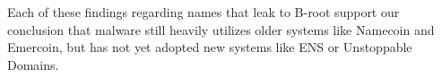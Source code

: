 Each of these findings regarding names that leak to B-root support our 
conclusion that malware still heavily utilizes older systems like Namecoin and 
Emercoin, but has not yet adopted new systems like ENS or Unstoppable Domains. 


%




